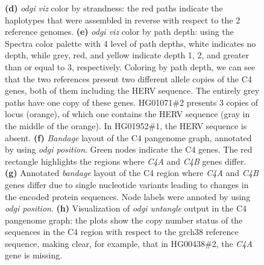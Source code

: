 \begin{figure}[!htb]
{        \textbf{(d)} \textit{odgi viz} color by strandness: the red paths indicate the haplotypes that were assembled in reverse with respect to the 2 reference genomes.
        \textbf{(e)} \textit{odgi viz} color by path depth: using the Spectra color palette with 4 level of path depths, white indicates no depth, while grey, red, and yellow indicate depth 1, 2, and greater than or equal to 3, respectively.
        Coloring by path depth, we can see that the two references present two different allele copies of the C4 genes, both of them including the HERV sequence.
        The entirely grey paths have one copy of these genes.
        HG01071\#2 presents 3 copies of locus (orange), of which one contains the HERV sequence (gray in the middle of the orange).
        In HG01952\#1, the HERV sequence is absent.
        \textbf{(f)} \textit{Bandage} layout of the C4 pangenome graph, annotated by using \textit{odgi position}. Green nodes indicate the C4 genes. The red rectangle highlights the regions where \textit{C4A} and \textit{C4B} genes differ.
        \textbf{(g)} Annotated \textit{bandage} layout of the C4 region where \textit{C4A} and \textit{C4B} genes differ due to single nucleotide variants leading to changes in the encoded protein sequences. Node labels were annoted by using \textit{odgi position}.
        \textbf{(h)} Visualization of \textit{odgi untangle} output in the C4 pangenome graph: the plots show the copy number status of the sequences in the C4 region with respect to the grch38 reference sequence, making clear, for example, that in HG00438\#2, the \textit{C4A} gene is missing. \vspace{-1em}
    }
    \label{fig:odgi_viz}
\end{figure}


